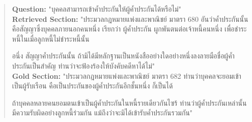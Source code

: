 \begin{quote}
\begin{thai}
\textbf{Question: } "บุคคลสามารถเข้าค้ำประกันให้ผู้ค้ำประกันได้หรือไม่"\\
\textbf{Retrieved Section: } "ประมวลกฎหมายแพ่งและพาณิชย์ มาตรา 680
อันว่าค้ำประกันนั้น คือสัญญาซึ่งบุคคลภายนอกคนหนึ่ง เรียกว่า ผู้ค้ำประกัน ผูกพันตนต่อเจ้าหนี้คนหนึ่ง เพื่อชำระหนี้ในเมื่อลูกหนี้ไม่ชำระหนี้นั้น

อนึ่ง สัญญาค้ำประกันนั้น ถ้ามิได้มีหลักฐานเป็นหนังสืออย่างใดอย่างหนึ่งลงลายมือชื่อผู้ค้ำประกันเป็นสำคัญ ท่านว่าจะฟ้องร้องให้บังคับคดีหาได้ไม่"  \\

\textbf{Gold Section: } "ประมวลกฎหมายแพ่งและพาณิชย์ มาตรา 682 ท่านว่าบุคคลจะยอมเข้าเป็นผู้รับเรือน คือเป็นประกันของผู้ค้ำประกันอีกชั้นหนึ่ง ก็เป็นได้

ถ้าบุคคลหลายคนยอมตนเข้าเป็นผู้ค้ำประกันในหนี้รายเดียวกันไซร้ ท่านว่าผู้ค้ำประกันเหล่านั้นมีความรับผิดอย่างลูกหนี้ร่วมกัน แม้ถึงว่าจะมิได้เข้ารับค้ำประกันรวมกัน"
\end{thai}
\end{quote}



